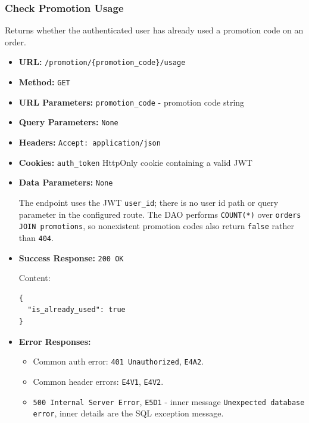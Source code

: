 \subsubsection*{Check Promotion Usage}

Returns whether the authenticated user has already used a promotion code on an order.

\begin{itemize}[nosep]
\item \textbf{URL:} \texttt{/promotion/\{promotion\_code\}/usage}

\item \textbf{Method:} \texttt{GET}

\item \textbf{URL Parameters:} \texttt{promotion\_code} - promotion code string

\item \textbf{Query Parameters:} \texttt{None}

\item \textbf{Headers:} \texttt{Accept: application/json}

\item \textbf{Cookies:} \texttt{auth\_token} HttpOnly cookie containing a valid JWT

\item \textbf{Data Parameters:} \texttt{None}

The endpoint uses the JWT \texttt{user\_id}; there is no user id path or query parameter in the configured route. The DAO performs \texttt{COUNT(*)} over \texttt{orders JOIN promotions}, so nonexistent promotion codes also return \texttt{false} rather than \texttt{404}.

\item \textbf{Success Response:} \texttt{200 OK}

Content:

\begin{lstlisting}
{
  "is_already_used": true
}
\end{lstlisting}

\item \textbf{Error Responses:}

\begin{itemize}[nosep]
\item Common auth error: \texttt{401 Unauthorized}, \texttt{E4A2}.
\item Common header errors: \texttt{E4V1}, \texttt{E4V2}.
\item \texttt{500 Internal Server Error}, \texttt{E5D1} - inner message \texttt{Unexpected database error}, inner details are the SQL exception message.
\end{itemize}

\end{itemize}
